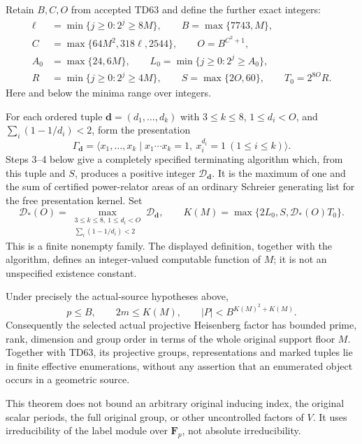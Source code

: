 Retain \(B,C,O\) from accepted TD63 and define the further exact integers:
\[
 \begin{split}
 \ell&=\min\{j\ge0:2^j\ge8M\},\qquad B=\max\{7743,M\},\\
 C&=\max\{64M^2,318\ell,2544\},\qquad O=B^{C^2+1},\\
 A_0&=\max\{24,6M\},\qquad
 L_0=\min\{j\ge0:2^j\ge A_0\},\\
 R&=\min\{j\ge0:2^j\ge4M\},\qquad
 S=\max\{2O,60\},\qquad T_0=2^{8O}R.
 \end{split}
 \tag{HER.3}
\]
Here and below the minima range over integers.

For each ordered tuple \(\boldsymbol d=(d_1,\ldots,d_k)\) with
\(3\le k\le8\), \(1\le d_i<O\), and
\(\sum_i(1-1/d_i)<2\), form the presentation
\[
 \Gamma_{\boldsymbol d}=
 \langle x_1,\ldots,x_k\mid
 x_1\cdots x_k=1,\ x_i^{d_i}=1\ (1\le i\le k)\rangle.
 \tag{HER.4}
\]
Steps 3--4 below give a completely specified terminating algorithm
which, from this tuple and \(S\), produces a positive integer
\(\mathcal D_{\boldsymbol d}\).  It is the maximum of one and the sum
of certified power-relator areas of an ordinary Schreier generating
list for the free presentation kernel.  Set
\[
 \mathcal D_*(O)=
 \max_{\substack{3\le k\le8,\ 1\le d_i<O\\
                  \sum_i(1-1/d_i)<2}}
                   \mathcal D_{\boldsymbol d},
 \qquad
 K(M)=\max\{2L_0,S,\mathcal D_*(O)T_0\}.
 \tag{HER.5}
\]
This is a finite nonempty family.  The displayed definition, together
with the algorithm, defines an integer-valued computable function of
\(M\); it is not an unspecified existence constant.

\begin{theorem}[D-TD64]
Under precisely the actual-source hypotheses above,
\[
             p\le B,\qquad 2m\le K(M),\qquad
             |P|<B^{K(M)^2+K(M)}.
 \tag{HER.6}
\]
Consequently the selected actual projective Heisenberg factor has
bounded prime, rank, dimension and group order in terms of the whole
original support floor \(M\).  Together with TD63, its projective
groups, representations and marked tuples lie in finite effective
enumerations, without any assertion that an enumerated object occurs
in a geometric source.

This theorem does not bound an arbitrary original inducing index,
the original scalar periods, the full original group, or other
uncontrolled factors of \(V\).  It uses irreducibility of the label
module over \(\mathbf F_p\), not absolute irreducibility.
\end{theorem}

